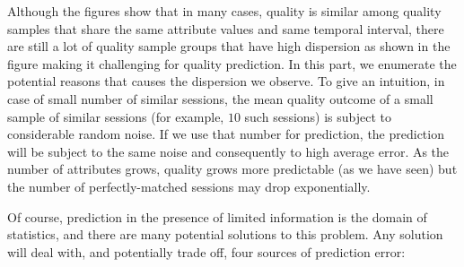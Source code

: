 {
}

Although the figures show that in many cases, quality is similar among quality samples that share the same attribute values and same temporal interval, there are still a lot of quality sample groups that have high dispersion as shown in the figure making it challenging for quality prediction. 
In this part, we enumerate the potential reasons that causes the dispersion we observe. To give an intuition, in case of small number of similar sessions, the mean quality outcome of a small sample of similar sessions (for example, $10$ such sessions) is subject to considerable random noise.  If we use that number for prediction, the prediction will be subject to the same noise and consequently to high average error.  As the number of attributes grows, quality grows more predictable (as we have seen) but the number of perfectly-matched sessions may drop exponentially.

Of course, prediction in the presence of limited information is the domain of statistics, and there are many potential solutions to this problem.  Any solution will deal with, and potentially trade off, four sources of prediction error:

